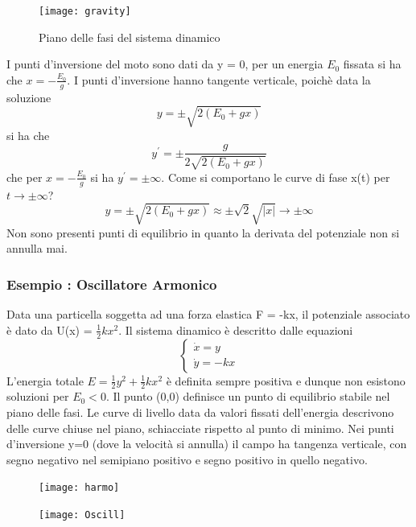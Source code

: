 \begin{figure}[!ht]
\vspace{0.1in}
\texttt{[image: gravity]}	
\centering
\vspace{0.1in}
\caption{Piano delle fasi del sistema dinamico}
\end{figure}

I punti d'inversione del moto sono dati da  y = 0, per un energia $E_0$ fissata si ha che $x = -\frac{E_0}{g}$. I punti d'inversione hanno tangente verticale, poich\`{e} data la soluzione 
\begin{equation*}
	y = \pm \sqrt{2(E_0 + gx)}
\end{equation*}
si ha che
\begin{equation*}
	y^{\prime} = \pm \frac{g}{2 \sqrt{2(E_{0} +gx)}} 
\end{equation*}
che per $x = -\frac{E_0}{g}$ si ha $y^{\prime} = \pm \infty $. \newline
Come si comportano le curve di fase x(t) per $t \rightarrow \pm \infty $?
\begin{equation*}
	y = \pm \sqrt{2(E_0 + gx)} \approx  \pm \sqrt{2}\sqrt{\vert x \vert } \rightarrow \pm \infty 
\end{equation*}
Non sono presenti punti di equilibrio in quanto la derivata del potenziale non si annulla mai.



\subsubsection{Esempio : Oscillatore Armonico}

Data una particella soggetta ad una forza elastica F = -kx, il potenziale associato \`{e} dato da U(x) = $\frac{1}{2}kx^2$. Il sistema dinamico \`{e} descritto dalle equazioni
\begin{equation*}
	\left \{ \begin{array}{l}
		\dot{x} = y \\
		\dot{y} = -kx 
	\end{array} \right.
\end{equation*}
L'energia totale $E = \frac{1}{2}y^2 + \frac{1}{2}kx^2$ \`{e} definita sempre positiva e dunque non esistono soluzioni per $E_0 < 0$. Il punto (0,0) definisce un punto di equilibrio stabile nel piano delle fasi. Le curve di livello data da valori fissati dell'energia descrivono delle curve chiuse nel piano, schiacciate rispetto al punto di minimo. Nei punti d'inversione y=0 (dove la velocit\`{a} si annulla) il campo ha tangenza verticale, con segno negativo nel semipiano positivo e segno positivo in quello negativo.
\begin{figure}
\centering
\begin{minipage}{.5\textwidth}
  \centering
  \texttt{[image: harmo]}
  \label{fig:test1}
\end{minipage}%
\begin{minipage}{.5\textwidth}
  \centering
  \texttt{[image: Oscill]}
  \label{fig:test2}
\end{minipage}
\end{figure}

